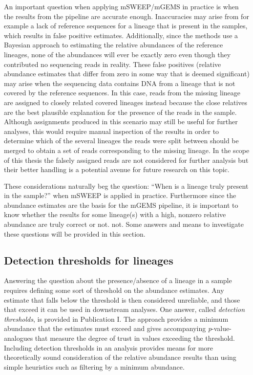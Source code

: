 \documentclass[officiallayout]{tktla}
\begin{document}
An important question when applying mSWEEP/mGEMS in practice is when
the results from the pipeline are accurate enough. Inaccuracies may
arise from for example a lack of reference sequences for a lineage
that is present in the samples, which results in false positive
estimates. Additionally, since the methods use a Bayesian approach to
estimating the relative abundances of the reference lineages, none of
the abundances will ever be exactly zero even though they contributed
no sequencing reads in reality. These false positives (relative
abundance estimates that differ from zero in some way that is deemed
significant) may arise when the sequencing data contains DNA from a
lineage that is not covered by the reference sequences. In this case,
reads from the missing lineage are assigned to closely related covered
lineages instead because the close relatives are the best plausible
explanation for the presence of the reads in the sample. Although
assignments produced in this scenario may still be useful for further
analyses, this would require manual inspection of the results in order
to determine which of the several lineages the reads were split
between should be merged to obtain a set of reads corresponding to the
missing lineage. In the scope of this thesis the falsely assigned
reads are not considered for further analysis but their better
handling is a potential avenue for future research on this topic.

These considerations naturally beg the question: ``When is a
lineage truly present in the sample?'' when mSWEEP is applied in
practice. Furthermore since the abundance estimates are the basis for
the mGEMS pipeline, it is important to know whether the results for
some lineage(s) with a high, nonzero relative abundance are truly
correct or not. not. Some answers and means to investigate these questions
will be provided in this section.

\subsection{Detection thresholds for lineages}
Answering the question about the presence/absence of a lineage in a
sample requires defining some sort of threshold on the abundance
estimates. Any estimate that falls below the threshold is then
considered unreliable, and those that exceed it can be used in
downstream analyses. One answer, called \textit{detection thresholds},
is provided in Publication I. The approach provides a minimum
abundance that the estimates must exceed and gives accompanying
\textit{p}-value-analogues that measure the degree of trust in values exceeding
the threshold. Including detection thresholds in an analysis provides
means for more theoretically sound consideration of the relative
abundance results than using simple heuristics such as filtering by a
minimum abundance.
\end{document}
